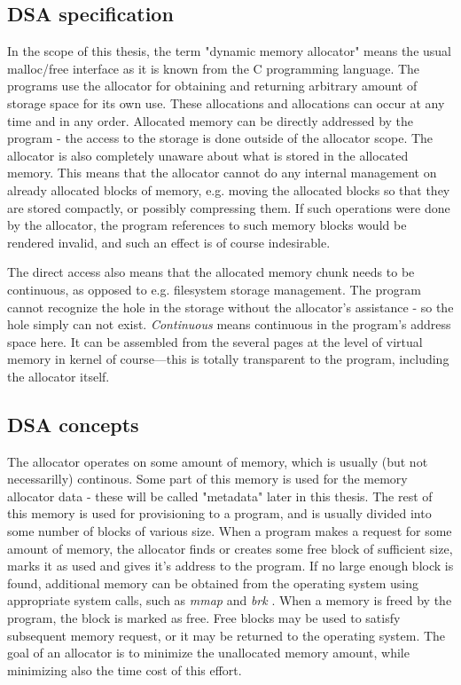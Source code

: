 \subsection{DSA specification}

In the scope of this thesis, the term "dynamic memory allocator" means the usual malloc/free interface as it is known from the C programming language. The programs use the allocator for obtaining and returning arbitrary amount of storage space for its own use. These allocations and allocations can occur at any time and in any order. Allocated memory can be directly addressed by the program - the access to the storage is done outside of the allocator scope. The allocator is also completely unaware about what is stored in the allocated memory. This means that the allocator cannot do any internal management on already allocated blocks of memory, e.g. moving the allocated blocks so that they are stored compactly, or possibly compressing them. If such operations were done by the allocator, the program references to such memory blocks would be rendered invalid, and such an effect is of course indesirable. 

The direct access also means that the allocated memory chunk needs to be continuous, as opposed to e.g. filesystem storage management. The program cannot recognize the hole in the storage without the allocator's assistance - so the hole simply can not exist. {\em Continuous} means continuous in the program's address space here. It can be assembled from the several pages at the level of virtual memory in kernel of course---this is totally transparent to the program, including the allocator itself. 

\subsection{DSA concepts}

The allocator operates on some amount of memory, which is usually (but not necessarilly) continous. Some part of this memory is used for the memory allocator data - these will be called "metadata" later in this thesis. The rest of this memory is used for provisioning to a program, and is usually divided into some number of blocks of various size. When a program makes a request for some amount of memory, the allocator finds or creates some free block of sufficient size, marks it as used and gives it's address to the program. If no large enough block is found, additional memory can be obtained from the operating system using appropriate system calls, such as {\em mmap} and {\em brk} \cite{sbrk-manpage, mmap-manpage}. When a memory is freed by the program, the block is marked as free. Free blocks may be used to satisfy subsequent memory request, or it may be returned to the operating system. The goal of an allocator is to minimize the unallocated memory amount, while minimizing also the time cost of this effort. 

